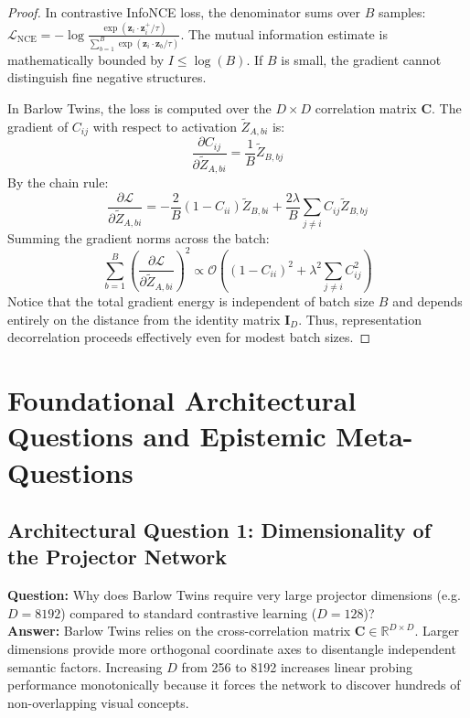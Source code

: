 \documentclass[11pt,a4paper]{article}
\theoremstyle{definition}
\begin{document}
\begin{proof}
In contrastive InfoNCE loss, the denominator sums over $B$ samples: $\mathcal{L}_{\text{NCE}} = -\log \frac{\exp(\mathbf{z}_i \cdot \mathbf{z}_i^+ / \tau)}{\sum_{b=1}^B \exp(\mathbf{z}_i \cdot \mathbf{z}_b / \tau)}$. The mutual information estimate is mathematically bounded by $I \le \log(B)$. If $B$ is small, the gradient cannot distinguish fine negative structures.

In Barlow Twins, the loss is computed over the $D \times D$ correlation matrix $\mathbf{C}$.
The gradient of $C_{ij}$ with respect to activation $\tilde{Z}_{A, bi}$ is:
{\boldmath
\begin{equation}
\frac{\partial C_{ij}}{\partial \tilde{Z}_{A, bi}} = \frac{1}{B} \tilde{Z}_{B, bj}
\end{equation}
}
By the chain rule:
{\boldmath
\begin{equation}
\frac{\partial \mathcal{L}}{\partial \tilde{Z}_{A, bi}} = -\frac{2}{B}(1 - C_{ii})\tilde{Z}_{B, bi} + \frac{2\lambda}{B} \sum_{j \ne i} C_{ij} \tilde{Z}_{B, bj}
\end{equation}
}
Summing the gradient norms across the batch:
{\boldmath
\begin{equation}
\sum_{b=1}^B \left( \frac{\partial \mathcal{L}}{\partial \tilde{Z}_{A, bi}} \right)^2 \propto \mathcal{O}\left( (1 - C_{ii})^2 + \lambda^2 \sum_{j \ne i} C_{ij}^2 \right)
\end{equation}
}
Notice that the total gradient energy is independent of batch size $B$ and depends entirely on the distance from the identity matrix $\mathbf{I}_D$. Thus, representation decorrelation proceeds effectively even for modest batch sizes.
\end{proof}

\section{Foundational Architectural Questions and Epistemic Meta-Questions}

\subsection{Architectural Question 1: Dimensionality of the Projector Network}
\textbf{Question:} Why does Barlow Twins require very large projector dimensions (e.g. $D = 8192$) compared to standard contrastive learning ($D = 128$)?\\
\textbf{Answer:} Barlow Twins relies on the cross-correlation matrix $\mathbf{C} \in \mathbb{R}^{D \times D}$. Larger dimensions provide more orthogonal coordinate axes to disentangle independent semantic factors. Increasing $D$ from 256 to 8192 increases linear probing performance monotonically because it forces the network to discover hundreds of non-overlapping visual concepts.
\end{document}
